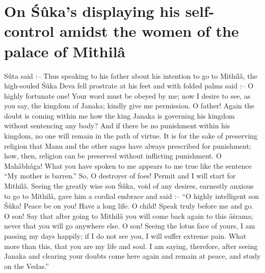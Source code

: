 \chapter{On \'S\^uka’s displaying his self-control amidst the women of the palace of Mithil\^a}

S\^uta said :-- Thus speaking to his father about his intention to go to Mithil\^a, the high-souled \'S\^uka Deva fell prostrate at his feet and with folded palms said :-- O highly fortunate one! Your word must be obeyed by me; now I desire to see, as you say, the kingdom of Janaka; kindly give me permission. O father! Again the doubt is coming within me how the king Janaka is governing his kingdom without sentencing any body? And if there be no punishment within his kingdom, no one will remain in the path of virtue. It is for the sake of preserving religion that Manu and the other sages have always prescribed for punishment; how, then, religion can be preserved without inflicting punishment. O Mah\^abh\^aga! What you have spoken to me appears to me true like the sentence ``My mother is barren.'' So, O destroyer of foes! Permit and I will start for Mithil\^a. Seeing the greatly wise son \'S\^uka, void of any desires, earnestly anxious to go to Mithil\^a, gave him a cordial embrace and said :-- ``O highly intelligent son \'S\^uka! Peace be on you! Have a long life. O child! Speak truly before me and go. O son! Say that after going to Mithil\^a you will come back again to this \^a\'srama; never that you will go anywhere else. O son! Seeing the lotus face of yours, I am passing my days happily; if I do not see you, I will suffer extreme pain. What more than this, that you are my life and soul. I am saying, therefore, after seeing Janaka and clearing your doubts come here again and remain at peace, and study on the Vedas.''

